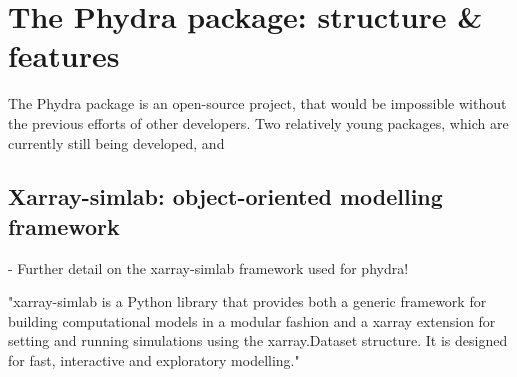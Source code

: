 \documentclass[template.tex]{subfiles}
\begin{document}
\section{The Phydra package: structure \& features} \label{Section:phydrapackage}

The Phydra package is an open-source project, that would be impossible without the previous efforts of other developers. Two relatively young packages, which are currently still being developed, \cite{Bovy2018Xarray-simlab:Interactively} and \cite{Beal2018GEKKOSuite}



\subsection{Xarray-simlab: object-oriented modelling framework}
- Further detail on the xarray-simlab framework used for phydra!

"xarray-simlab is a Python library that provides both a generic framework for building computational models in a modular fashion and a xarray extension for setting and running simulations using the xarray.Dataset structure. It is designed for fast, interactive and exploratory modelling."
\end{document}
